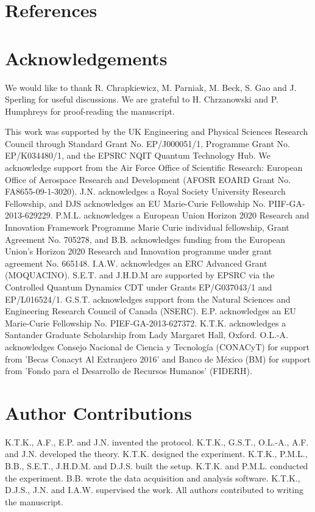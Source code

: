 \documentclass[12pt]{iopart}
\begin{document}


%

\section*{References}

 



\section*{Acknowledgements}
We would like to thank R. Chrapkiewicz, M. Parniak, M. Beck, S. Gao and J. Sperling for useful discussions. We are grateful to H. Chrzanowski and P. Humphreys for proof-reading the manuscript.

This work was supported by the UK Engineering and Physical Sciences Research Council through Standard Grant No. EP/J000051/1, Programme Grant No. EP/K034480/1, and the EPSRC NQIT Quantum Technology Hub. We acknowledge support from the Air Force Office of Scientific Research: European Office of Aerospace Research and Development (AFOSR EOARD Grant No. FA8655-09-1-3020). J.N. acknowledges a Royal Society University Research Fellowship, and DJS acknowledges an EU Marie-Curie Fellowship No. PIIF-GA-2013-629229. P.M.L. acknowledges a European Union Horizon 2020 Research and Innovation Framework Programme Marie Curie individual fellowship, Grant Agreement No. 705278, and B.B. acknowledges funding from the European Union’s Horizon 2020 Research and Innovation programme under grant agreement No. 665148. I.A.W. acknowledges an ERC Advanced Grant (MOQUACINO). S.E.T. and J.H.D.M are supported by EPSRC via the Controlled Quantum Dynamics CDT under Grants EP/G037043/1 and EP/L016524/1. G.S.T. acknowledges support from the Natural Sciences and Engineering Research Council of Canada (NSERC). E.P. acknowledges an EU Marie-Curie Fellowship No. PIEF-GA-2013-627372. K.T.K. acknowledges a Santander Graduate Scholarship from Lady Margaret Hall, Oxford. O.L.-A. acknowledges Consejo Nacional de Ciencia y Tecnología (CONACyT) for support from 'Becas Conacyt Al Extranjero 2016' and Banco de M\'exico (BM) for support from 'Fondo para el Desarrollo de Recursos Humanos' (FIDERH).


\section*{Author Contributions}
K.T.K., A.F., E.P. and J.N. invented the protocol. K.T.K., G.S.T., O.L.-A., A.F. and J.N. developed the theory. K.T.K. designed the experiment. K.T.K., P.M.L., B.B., S.E.T., J.H.D.M. and D.J.S. built the setup. K.T.K. and P.M.L. conducted the experiment. B.B. wrote the data acquisition and analysis software. K.T.K., D.J.S., J.N. and I.A.W. supervised the work. All authors contributed to writing the manuscript.
\end{document}
